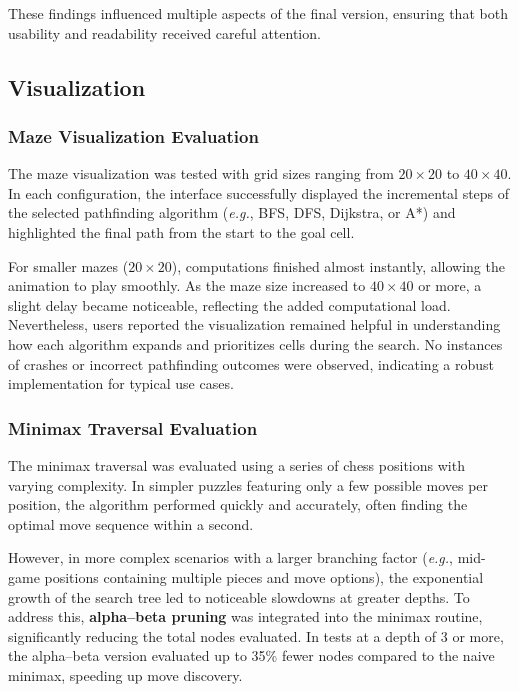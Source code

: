 \documentclass[12pt,a4paper]{article}
\begin{document}
These findings influenced multiple aspects of the final version, ensuring that both usability and readability received careful attention.

\subsection{Visualization}
\subsubsection{Maze Visualization Evaluation}
\label{subsec:maze_eval}
The maze visualization was tested with grid sizes ranging from \(20 \times 20\) to \(40 \times 40\). 
In each configuration, the interface successfully displayed the incremental steps of the selected pathfinding algorithm 
(\textit{e.g.}, BFS, DFS, Dijkstra, or A*) and highlighted the final path from the start to the goal cell.

For smaller mazes (\(20 \times 20\)), computations finished almost instantly, allowing the animation to play smoothly. 
As the maze size increased to \(40 \times 40\) or more, a slight delay became noticeable, reflecting the added 
computational load. Nevertheless, users reported the visualization remained helpful in understanding how each algorithm 
expands and prioritizes cells during the search. No instances of crashes or incorrect pathfinding outcomes were observed, 
indicating a robust implementation for typical use cases.

\subsubsection{Minimax Traversal Evaluation}
\label{subsec:minimax_eval}
The minimax traversal was evaluated using a series of chess positions with varying complexity. 
In simpler puzzles featuring only a few possible moves per position, the algorithm performed quickly and accurately, 
often finding the optimal move sequence within a second.

However, in more complex scenarios with a larger branching factor (\textit{e.g.}, mid-game positions containing multiple 
pieces and move options), the exponential growth of the search tree led to noticeable slowdowns at greater depths. 
To address this, \textbf{alpha--beta pruning} was integrated into the minimax routine, 
significantly reducing the total nodes evaluated. 
In tests at a depth of 3 or more, the alpha--beta version evaluated up to 35\% fewer nodes compared to the naive minimax, 
speeding up move discovery. 
\end{document}
